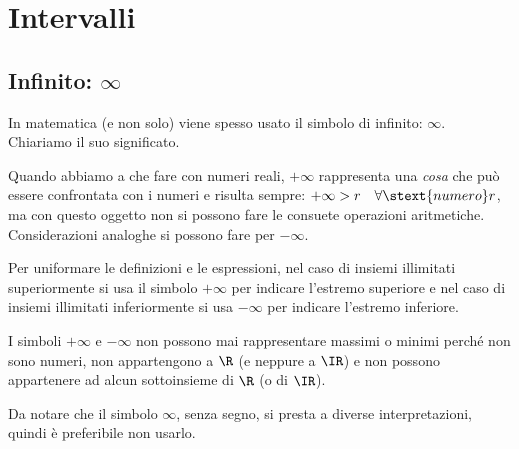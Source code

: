 \section{Intervalli}
\label{sec:topologiaintervalli}

\subsection{Infinito: \(\infty\)}

In matematica (e non solo) viene spesso usato il simbolo di infinito: 
\(\infty\).
Chiariamo il suo significato.


\vspace{.5em}
Quando abbiamo a che fare con numeri reali, \(+\infty\) 
rappresenta una \emph{cosa} che può essere confrontata con i numeri e risulta 
sempre: \quad \(+\infty > r \quad \forall \stext{numero} r\), ma con questo 
oggetto non si possono fare le consuete operazioni aritmetiche. 
Considerazioni analoghe si possono fare per \(-\infty\).

Per uniformare le definizioni e le espressioni, nel caso di insiemi 
illimitati superiormente si usa il simbolo \(+\infty\) 
per indicare l'estremo superiore e 
nel caso di insiemi illimitati inferiormente si usa \(-\infty\) 
per indicare l'estremo inferiore.

I simboli \(+\infty\) e \(-\infty\) non possono mai rappresentare 
massimi o minimi perché non sono numeri, non appartengono a \(\R\) 
(e neppure a \(\IR\))
e non possono appartenere ad alcun sottoinsieme di \(\R\) 
(o di \(\IR\)).

\begin{newoss}{}{}
Da notare che il simbolo \(\infty\), senza segno, si presta a diverse 
interpretazioni, quindi è preferibile non usarlo.
\end{newoss}

